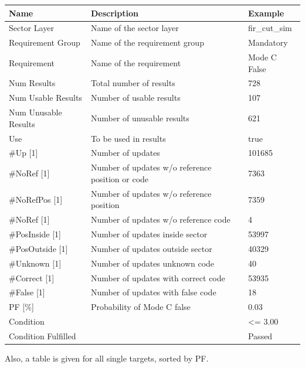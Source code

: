 \begin{center}
 \begin{table}[H]
  \begin{tabularx}{\textwidth}{ | l | X |  l | }
    \hline
    \textbf{Name} & \textbf{Description} & \textbf{Example} \\ \hline
    Sector Layer & Name of the sector layer & fir\_cut\_sim \\ \hline
    Requirement Group & Name of the requirement group & Mandatory \\ \hline
    Requirement & Name of the requirement & Mode C False \\ \hline
    Num Results & Total number of results & 728 \\ \hline
    Num Usable Results & Number of usable results & 107 \\ \hline
    Num Unusable Results & Number of unusable results & 621 \\ \hline
    Use & To be used in results & true \\ \hline
    \#Up [1] & Number of updates & 101685 \\ \hline
    \#NoRef [1] & Number of updates w/o reference position or code & 7363 \\ \hline
    \#NoRefPos [1] & Number of updates w/o reference position  & 7359 \\ \hline
    \#NoRef [1] & Number of updates w/o reference code & 4 \\ \hline
    \#PosInside [1] & Number of updates inside sector & 53997 \\ \hline
    \#PosOutside [1] & Number of updates outside sector & 40329 \\ \hline
    \#Unknown [1] & Number of updates unknown code & 40 \\ \hline
    \#Correct [1] & Number of updates with correct code & 53935 \\ \hline
    \#False [1] & Number of updates with false code & 18 \\ \hline
    PF [\%] & Probability of Mode C false & 0.03 \\ \hline
    Condition &  & <= 3.00 \\ \hline
    Condition Fulfilled &  & Passed \\ \hline
\end{tabularx}
\end{table}
\end{center}

Also, a table is given for all single targets, sorted by PF.

